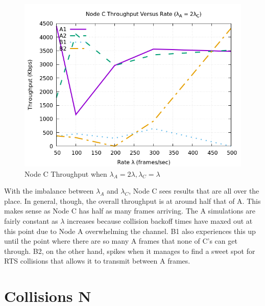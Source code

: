 \documentclass[12pt]{article}
\begin{document}
\begin{enumerate}
{            \begin{figure}[!htb]
                \centering
                \includegraphics[width=5in]{1D.png}
                \caption{Node C Throughput when \(\lambda{}_A = 2\lambda{}, \lambda{}_C = \lambda{}\) }
                \label{fig:1D}
            \end{figure}

            With the imbalance between \(\lambda{}_A\) and \(\lambda{}_C\), Node C sees results that are all over the place. In general, though, the overall throughput is at around half that of A. This makes sense as Node C has half as many frames arriving. The A simulations are fairly constant as \(\lambda{}\) increases because collision backoff times have maxed out at this point due to Node A overwhelming the channel. B1 also experiences this up until the point where there are so many A frames that none of C's can get through. B2, on the other hand, spikes when it manages to find a sweet spot for RTS collisions that allows it to transmit between A frames.
        }
        
    \end{enumerate}
        
\clearpage        
\section{Collisions N}
\end{document}
